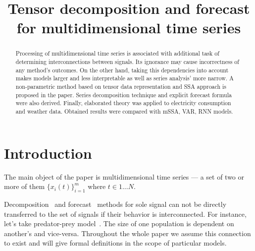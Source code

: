 \documentclass[referee, pdflatex]{sn-jnl}
\theoremstyle{definition}
\theoremstyle{plain}
\begin{document}
	
	\title{Tensor decomposition and forecast for multidimensional time series}
	
	\author*[1]{ }
	\author*[2]{ }
	
	
	
	\maketitle
	
	\begin{abstract}
		
		Processing of multidimensional time series is associated with additional task of determining interconnections between signals. Its ignorance may cause incorrectness of any method's outcomes. On the other hand, taking this dependencies into account makes models larger and less interpretable as well as series analysis' more narrow. A non-parametric method based on tensor data representation and SSA approach is proposed in the paper. Series decomposition technique and explicit forecast formula were also derived. Finally, elaborated theory was applied to electricity consumption and weather data. Obtained results were compared with mSSA, VAR, RNN models.
		
	\end{abstract}
	
	\section{Introduction}\label{Intro}
	
	The main object of the paper is multidimensional time series --- a set of two or more of them $ \{x_i(t)\}_{i=1}^m $ where $ t \in 1 \ldots N $. %
	
	Decomposition~\cite{enders2010applied, x11, cleveland90} and forecast~\cite{3b1355aedd1041f1853e609a410576f3, enders2010applied, Box_Jenkins_methodology, motrenko2022continuous} methods for sole signal can not be directly transferred to the set of signals if their behavior is interconnected. For instance, let's take predator-prey model~\cite{Volterra:1928}. The size of one population is dependent on another's and vice-versa. Throughout the whole paper we assume this connection to exist and will give formal definitions in the scope of particular models. 
	
\end{document}
